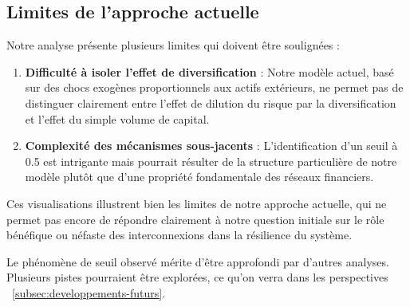 \subsection{Limites de l'approche actuelle}\label{subsec:limites-de-l'approche-actuelle}

Notre analyse présente plusieurs limites qui doivent être soulignées :

\begin{enumerate}
    \item \textbf{Difficulté à isoler l'effet de diversification} : Notre modèle actuel, basé sur des chocs exogènes proportionnels aux actifs extérieurs, ne permet pas de distinguer clairement entre l'effet de dilution du risque par la diversification et l'effet du simple volume de capital.

    \item \textbf{Complexité des mécanismes sous-jacents} : L'identification d'un seuil à 0.5 est intrigante mais pourrait résulter de la structure particulière de notre modèle plutôt que d'une propriété fondamentale des réseaux financiers.
\end{enumerate}

Ces visualisations illustrent bien les limites de notre approche actuelle, qui ne permet pas encore de répondre clairement à notre question initiale sur le rôle bénéfique ou néfaste des interconnexions dans la résilience du système.

Le phénomène de seuil observé mérite d'être approfondi par d'autres analyses.
Plusieurs pistes pourraient être explorées, ce qu'on verra dans les perspectives ~\ref{subsec:developpements-futurs}.